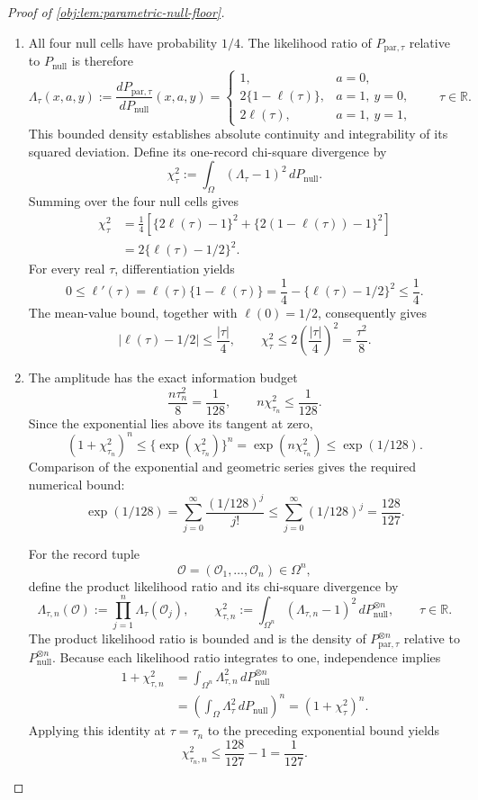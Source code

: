\begin{proof}[Proof of \cref{obj:lem:parametric-null-floor}]
\begin{enumerate}
\item All four null cells have probability \(1/4\). The likelihood ratio of \(P_{\mathrm{par},\tau}\) relative to \(P_{\mathrm{null}}\) is therefore
\[
\Lambda_\tau(x,a,y)
:=
\frac{dP_{\mathrm{par},\tau}}{dP_{\mathrm{null}}}(x,a,y)
=
\begin{cases}
1,&a=0,\\
2\{1-\ell(\tau)\},&a=1,\ y=0,\\
2\ell(\tau),&a=1,\ y=1,
\end{cases}
\qquad \tau\in\mathbb R.
\]
This bounded density establishes absolute continuity and integrability of its squared deviation. Define its one-record chi-square divergence by
\[
\chi^2_\tau
:=
\int_\Omega(\Lambda_\tau-1)^2\,dP_{\mathrm{null}}.
\]
Summing over the four null cells gives
\[
\begin{aligned}
\chi^2_\tau
&=
\frac14\left[
\{2\ell(\tau)-1\}^2+
\{2(1-\ell(\tau))-1\}^2
\right]\\
&=2\{\ell(\tau)-1/2\}^2.
\end{aligned}
\]
For every real \(\tau\), differentiation yields
\[
0\le\ell'(\tau)
=\ell(\tau)\{1-\ell(\tau)\}
=\frac14-\{\ell(\tau)-1/2\}^2
\le\frac14.
\]
The mean-value bound, together with \(\ell(0)=1/2\), consequently gives
\[
|\ell(\tau)-1/2|\le\frac{|\tau|}{4},
\qquad
\chi^2_\tau
\le2\left(\frac{|\tau|}{4}\right)^2
=\frac{\tau^2}{8}.
\]

\item The amplitude has the exact information budget
\[
\frac{n\tau_n^2}{8}=\frac1{128},
\qquad
n\chi^2_{\tau_n}\le\frac1{128}.
\]
Since the exponential lies above its tangent at zero,
\[
(1+\chi^2_{\tau_n})^n
\le
\{\exp(\chi^2_{\tau_n})\}^n
=
\exp(n\chi^2_{\tau_n})
\le
\exp(1/128).
\]
Comparison of the exponential and geometric series gives the required numerical bound:
\[
\exp(1/128)
=
\sum_{j=0}^{\infty}\frac{(1/128)^j}{j!}
\le
\sum_{j=0}^{\infty}(1/128)^j
=
\frac{128}{127}.
\]

For the record tuple
\[
\mathcal O=(\mathcal O_1,\ldots,\mathcal O_n)\in\Omega^n,
\]
define the product likelihood ratio and its chi-square divergence by
\[
\Lambda_{\tau,n}(\mathcal O)
:=
\prod_{j=1}^n\Lambda_\tau(\mathcal O_j),
\qquad
\chi^2_{\tau,n}
:=
\int_{\Omega^n}(\Lambda_{\tau,n}-1)^2
\,dP_{\mathrm{null}}^{\otimes n},
\qquad \tau\in\mathbb R.
\]
The product likelihood ratio is bounded and is the density of
\(P_{\mathrm{par},\tau}^{\otimes n}\) relative to
\(P_{\mathrm{null}}^{\otimes n}\). Because each likelihood ratio integrates to one, independence implies
\[
\begin{aligned}
1+\chi^2_{\tau,n}
&=
\int_{\Omega^n}\Lambda_{\tau,n}^2
\,dP_{\mathrm{null}}^{\otimes n}\\
&=
\left(\int_\Omega\Lambda_\tau^2\,dP_{\mathrm{null}}\right)^n
=
(1+\chi^2_\tau)^n.
\end{aligned}
\]
Applying this identity at \(\tau=\tau_n\) to the preceding exponential bound yields
\[
\chi^2_{\tau_n,n}
\le\frac{128}{127}-1
=\frac1{127}.
\]


\end{enumerate}
\end{proof}
